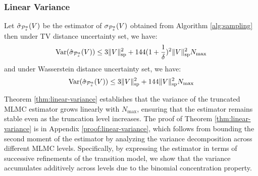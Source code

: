 \subsubsection{Linear Variance}

\begin{theorem}
\label{thm:linear-variance}
Let $\hat{\sigma}_{\mathcal{P}^a_s}(V)$ be the estimator of ${\sigma}_{\mathcal{P}^a_s}(V)$ obtained from Algorithm \ref{alg:sampling} then under TV distance uncertainty set, we have:
\begin{equation}
 \mathrm{Var}(\hat{\sigma}_{\mathcal{P}^a_s}(V)) \leq  3\|V\|_{\mathrm{sp}}^2 + 144(1+\frac{1}{\delta})^2\|V\|_{\mathrm{sp}}^2 N_{\max}
\end{equation}
and under Wasserstein distance uncertainty set, we have:
\begin{equation}
 \mathrm{Var}(\hat{\sigma}_{\mathcal{P}^a_s}(V)) \leq  3\|V\|_{\mathrm{sp}}^2 + 144\|V\|_{\mathrm{sp}}^2 N_{\max}
\end{equation}
\end{theorem}

Theorem \ref{thm:linear-variance} establishes that the variance of the truncated MLMC estimator grows linearly with $N_{\max}$, ensuring that the estimator remains stable even as the truncation level increases.
The proof of Theorem \ref{thm:linear-variance} is in Appendix \ref{proof:linear-variance}, which follows from bounding the second moment of the estimator by analyzing the variance decomposition 
across different MLMC levels. Specifically, by expressing the estimator in terms of successive refinements of the transition model, we show that the variance accumulates additively across levels due to the binomial concentration property.